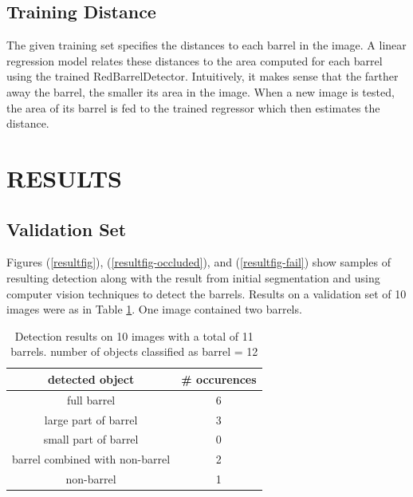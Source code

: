 \documentclass[letterpaper, 10 pt, conference]{ieeeconf}  %
\begin{document}
\subsection{Training Distance}

The given training set specifies the distances to each barrel in the image. A linear regression model relates these distances to the area computed for each barrel using the trained RedBarrelDetector. Intuitively, it makes sense that the farther away the barrel, the smaller its area in the image. When a new image is tested, the area of its barrel is fed to the trained regressor which then estimates the distance.

\section{RESULTS}
\subsection{Validation Set}
Figures (\ref{resultfig}), (\ref{resultfig-occluded}), and (\ref{resultfig-fail}) show samples of resulting detection along with the result from initial segmentation and using computer vision techniques to detect the barrels. Results on a validation set of 10 images were as in Table \ref{resultsvalidation}. One image contained two barrels. 

\begin{table}[h]
\caption{Detection results on 10 images with a total of 11 barrels. number of objects classified as barrel = 12}
\label{resultsvalidation}
\begin{center}
\begin{tabular}{|c|c|}
\hline
detected object & \# occurences\\
\hline
full barrel & 6\\
\hline
large part of barrel & 3\\
\hline
small part of barrel & 0\\
\hline
barrel combined with non-barrel & 2\\
\hline
non-barrel & 1\\
\hline
\end{tabular}
\end{center}
\end{table}
\end{document}
